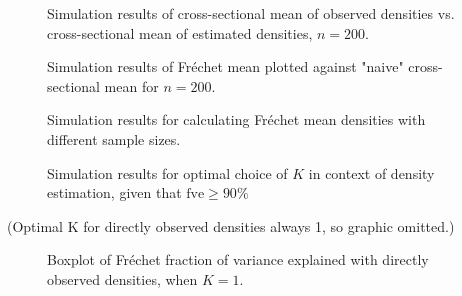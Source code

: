 \begin{figure}[h]
    \centering
    \resizebox{0.9\textwidth}{!}{}
    \caption[Simulation results: observed vs estimated densities --- cross-sectional mean]{Simulation
    results of cross-sectional mean of observed densities vs. cross-sectional mean of
    estimated densities, $n=200$.}
    \label{fig:sim_cs_denstimation}
\end{figure}

\begin{figure}[h]
    \centering
    \resizebox{0.9\textwidth}{!}{}
    \caption[Simulation results: Fréchet mean vs cross-sectional mean]{Simulation
    results of Fréchet mean plotted against "naive" cross-sectional mean for $n = 200$.}
    \label{fig:sim_f_vs_cs}
\end{figure}

\begin{figure}[h]
    \centering
    \resizebox{0.9\textwidth}{!}{}
    \caption[Simulation results: average Fréchet means]{Simulation results for calculating
    Fréchet mean densities with different sample sizes.}
    \label{fig:sim_f_mean}
\end{figure}

\begin{figure}[h]
    \centering
    \resizebox{0.9\textwidth}{!}{}
    \caption[Simulation results: optimal $K$]{Simulation results for optimal choice of
    $K$ in context of density estimation, given that $\text{fve} \geq 90 \%$}
    \label{fig:sim_k_opt_denstimation}
\end{figure}

(Optimal K for directly observed densities always 1, so graphic omitted.)

\begin{figure}[h]
    \centering
    \resizebox{0.9\textwidth}{!}{}
    \caption[Simulation results: boxplots fve --- observed densities]{Boxplot of
    Fréchet fraction of variance explained with directly observed
    densities, when $K = 1$.}
    \label{fig:sim_fve}
\end{figure}

